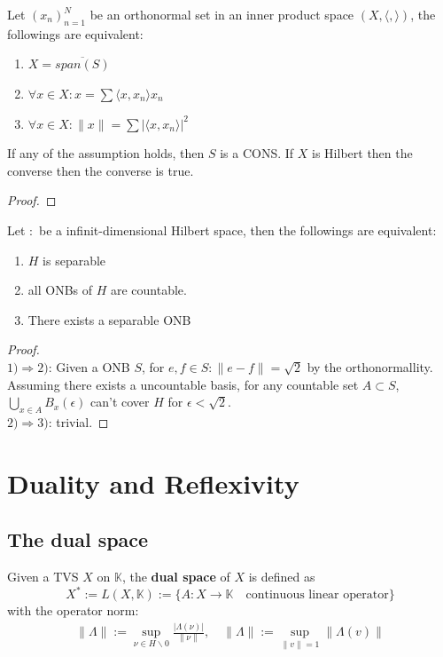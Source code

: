 \begin{theorem}
	Let $(x_n)_{n = 1}^N$ be an orthonormal set in an inner product space $(X, \langle, \rangle) $, the followings are equivalent:
	\begin{enumerate}
		\item $X = \overline{span(S)}$
		\item $\forall x \in X: x = \sum \langle x, x_n\rangle x_n$
		\item $\forall x \in X: \|x\| = \sum |\langle x, x_n\rangle|^2$ 
	\end{enumerate} 
	If any of the assumption holds, then $S$ is a CONS. If $X$ is Hilbert then the converse then the converse is true.	
\end{theorem}
\begin{proof}
\end{proof}

\begin{theorem}
	Let $:$ be a infinit-dimensional Hilbert space, then the followings are equivalent:
	\begin{enumerate}
		\item $H$ is separable
		\item all ONBs of $H$ are countable.
		\item There exists a separable ONB
	\end{enumerate} 
\end{theorem}
\begin{proof}
	\quad\\
	$1)\Rightarrow 2)$: Given a ONB $S$, for $e, f \in S: \|e -f\| = \sqrt{2}$ by the orthonormallity. Assuming there exists a uncountable basis, for any countable set $A \subset S$, $\bigcup_{x \in A} B_x(\epsilon)$ can't cover $H$ for $\epsilon < \sqrt{2}$.  \\
	$2)\Rightarrow 3)$: trivial. 
\end{proof}

\newpage
\section{Duality and Reflexivity}
\subsection{The dual space}
\begin{definition}
	Given a TVS $X$ on $\mathbb{K}$, the \textbf{dual space} of $X$ is defined as
	\begin{equation*}
		X^* := L(X, \mathbb{K}) := \{ A: X \rightarrow \mathbb{K} \quad \text{continuous linear operator}\}
	\end{equation*}
	with the operator norm:
	\begin{align*}
	\|\Lambda\|:= \sup_{\nu \in H \backslash 0} \frac{|\Lambda (\nu)|}{\|\nu\|}, \quad \|\Lambda\|:= \sup_{\|v\| = 1} \|\Lambda(v)\|
\end{align*}
\end{definition}

